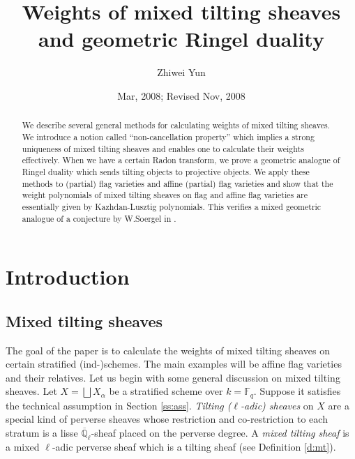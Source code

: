 \documentclass{amsart}
\theoremstyle{plain}
\theoremstyle{definition}
\theoremstyle{remark}
\numberwithin{equation}{subsection}
\begin{document}
\title{Weights of mixed tilting sheaves and geometric Ringel duality}
\author{Zhiwei Yun}
\address{
Department of Mathematics,\\ 
Princeton University,\\ 
Princeton, NJ 08544,\\
U.S.A.}




\date{Mar, 2008; Revised Nov, 2008}

\begin{abstract}
We describe several general methods for calculating weights of mixed tilting sheaves. We introduce a notion called ``non-cancellation property'' which implies a strong uniqueness of mixed tilting sheaves and enables one to calculate their weights effectively. When we have a certain Radon transform, we prove a geometric analogue of Ringel duality which sends tilting objects to projective objects. We apply these methods to (partial) flag varieties and affine (partial) flag varieties and show that the weight polynomials of mixed tilting sheaves on flag and affine flag varieties are essentially given by Kazhdan-Lusztig polynomials. This verifies a mixed geometric analogue of a conjecture by W.Soergel in \cite{Sg1}.
\end{abstract}

\maketitle

\section{Introduction}

\subsection{Mixed tilting sheaves}
The goal of the paper is to calculate the weights of mixed tilting sheaves on certain stratified (ind-)schemes. The main examples will be affine flag varieties and their relatives. Let us begin with some general discussion on mixed tilting sheaves. Let $X=\bigsqcup X_\alpha$ be a stratified scheme over $k={\mathbb{F}}_q$. Suppose it satisfies the technical assumption in Section \ref{ss:ass}. {\em Tilting ($\ell$-adic) sheaves} on $X$ are a special kind of perverse sheaves whose restriction and co-restriction to each stratum is a lisse ${\overline{\mathbb{Q}}_{\ell}}$-sheaf placed on the perverse degree. A {\em mixed tilting sheaf} is a mixed $\ell$-adic perverse sheaf which is a tilting sheaf (see Definition \ref{d:mt}).
\end{document}
